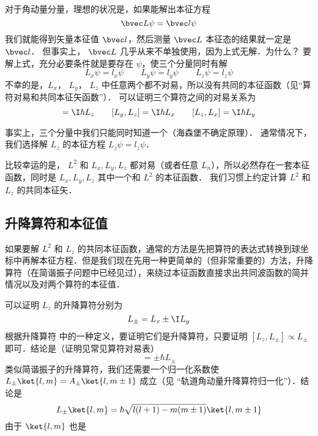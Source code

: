 对于角动量分量，理想的状况是，如果能解出本征方程
\begin{equation}
\bvec L \psi  = \bvec l\psi 
\end{equation}
我们就能得到矢量本征值 $\bvec l$，然后测量 $\bvec L$ 本征态的结果就一定是 $\bvec l$． 但事实上， $\bvec L$ 几乎从来不单独使用，因为上式无解．为什么？ 要解上式，充分必要条件就是要存在 $\psi$，使三个分量同时有解
\begin{equation}
L_x \psi  = l_x \psi \qquad
L_y \psi  = l_y \psi \qquad
L_z \psi  = l_z \psi 
\end{equation}   
不幸的是，$L_x$， $L_y$， $L_z$ 中任意两个都不对易，所以没有共同的本征函数（见“算符对易和共同本征矢函数”）． 可以证明三个算符之间的对易关系为
\begin{equation}
[L_x, L_y] = \I\hbar L_z \qquad
[L_y, L_z] = \I\hbar L_x \qquad
[L_z, L_x] = \I\hbar L_y
\end{equation}

事实上，三个分量中我们只能同时知道一个（海森堡不确定原理）．%
通常情况下，我们选择解 $L_z$ 的本征方程 $L_z \psi = l_z\psi$． 

比较幸运的是， $L^2$ 和 $L_x, L_y, L_z$ 都对易（或者任意 $L_n$），所以必然存在一套本征函数，同时是 $L_x, L_y, L_z$ 其中一个和 $L^2$ 的本征函数． 我们习惯上约定计算 $L^2$ 和 $L_z$ 的共同本征矢．

\subsection{升降算符和本征值}

如果要解 $L^2$ 和 $L_z$ 的共同本征函数，通常的方法是先把算符的表达式转换到球坐标中再解本征方程．但是我们现在先用一种更简单的（但非常重要的）方法，升降算符（在简谐振子问题中已经见过），来绕过本征函数直接求出共同波函数的简并情况以及对两个算符的本征值．

可以证明 $L_z$ 的升降算符分别为
\begin{equation}
L_\pm = L_x \pm \I L_y
\end{equation}
根据升降算符 中的一种定义，要证明它们是升降算符，只要证明 $[L_z, L_\pm] \propto L_\pm$ 即可．结论是（证明见常见算符对易表）%
\begin{equation}
[L_z, L_\pm] =  \pm \hbar L_ \pm
\end{equation}
类似简谐振子的升降算符，我们还需要一个归一化系数使 $L_\pm \ket{l,m} = A_ \pm \ket{l,m \pm 1}$ 成立（见 “轨道角动量升降算符归一化”）．结论是
\begin{equation}
L_\pm \ket{l, m}  = \hbar \sqrt{l(l + 1) - m(m \pm 1)} \ket{l, m \pm 1} 
\end{equation}
由于 $\ket{l,m}$ 也是

